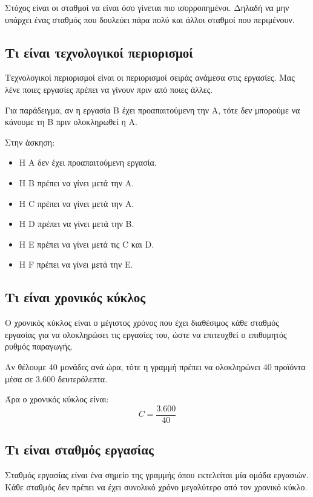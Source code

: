 \documentclass[12pt,a4paper]{article}
\begin{document}
Στόχος είναι οι σταθμοί να είναι όσο γίνεται πιο ισορροπημένοι. Δηλαδή να μην υπάρχει ένας σταθμός που δουλεύει πάρα πολύ και άλλοι σταθμοί που περιμένουν.

\subsection{Τι είναι τεχνολογικοί περιορισμοί}

Τεχνολογικοί περιορισμοί είναι οι περιορισμοί σειράς ανάμεσα στις εργασίες. Μας λένε ποιες εργασίες πρέπει να γίνουν πριν από ποιες άλλες.

Για παράδειγμα, αν η εργασία B έχει προαπαιτούμενη την A, τότε δεν μπορούμε να κάνουμε τη B πριν ολοκληρωθεί η A.

Στην άσκηση:

\begin{itemize}
    \item Η A δεν έχει προαπαιτούμενη εργασία.
    \item Η B πρέπει να γίνει μετά την A.
    \item Η C πρέπει να γίνει μετά την A.
    \item Η D πρέπει να γίνει μετά την B.
    \item Η E πρέπει να γίνει μετά τις C και D.
    \item Η F πρέπει να γίνει μετά την E.
\end{itemize}

\subsection{Τι είναι χρονικός κύκλος}

Ο χρονικός κύκλος είναι ο μέγιστος χρόνος που έχει διαθέσιμος κάθε σταθμός εργασίας για να ολοκληρώσει τις εργασίες του, ώστε να επιτευχθεί ο επιθυμητός ρυθμός παραγωγής.

Αν θέλουμε 40 μονάδες ανά ώρα, τότε η γραμμή πρέπει να ολοκληρώνει 40 προϊόντα μέσα σε 3.600 δευτερόλεπτα.

Άρα ο χρονικός κύκλος είναι:
\[
C=\frac{3.600}{40}
\]

\subsection{Τι είναι σταθμός εργασίας}

Σταθμός εργασίας είναι ένα σημείο της γραμμής όπου εκτελείται μία ομάδα εργασιών. Κάθε σταθμός δεν πρέπει να έχει συνολικό χρόνο μεγαλύτερο από τον χρονικό κύκλο.
\end{document}
